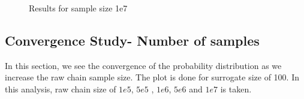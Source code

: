\begin{figure}[H]
\centering
{}             
    \caption{Results for sample size 1e7}
\end{figure}


\subsection{Convergence Study- Number of samples }

 In this section, we see the convergence of the probability distribution as we increase the raw chain sample size. The plot is done for surrogate size of 100. In this analysis, raw chain size of $1e5$, $5e5$ , $1e6$, $5e6$ and $1e7$ is taken. 

